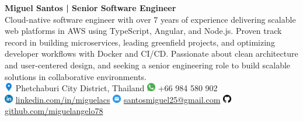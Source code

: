\documentclass[11pt,a4paper]{moderncv}
\title{}
\begin{document}
\vspace*{-2em}
\noindent
\begin{minipage}[t]{0.13\textwidth}
\end{minipage}%
\hspace{2em}%
\begin{minipage}[c]{0.80\textwidth}
  \raggedright
  \textbf{\LARGE Miguel Santos | Senior Software Engineer}\\[0.3em]
  Cloud-native software engineer with over 7 years of experience delivering scalable web platforms in AWS using TypeScript, Angular, and Node.js. Proven track record in building microservices, leading greenfield projects, and optimizing developer workflows with Docker and CI/CD. Passionate about clean architecture and user-centered design, and seeking a senior engineering role to build scalable solutions in collaborative environments.\\[0.8em]
  {\footnotesize
    \includegraphics[height=1em]{images/icon-location.png}
    Phetchaburi City District, Thailand 
    \hspace{0.8em}
    {\includegraphics[height=1em]{images/icon-whatsapp.png}}
    +66 984 580 902 \\[0.3em]

    {\includegraphics[height=1em]{images/icon-linkedin.png}}
    \href{https://linkedin.com/in/miguelacs}{linkedin.com/in/miguelacs}
    \hspace{0.8em}
    {\includegraphics[height=1em]{images/icon-email.png}}
    \href{mailto:santosmiguel25@gmail.com}{santosmiguel25@gmail.com}
    \hspace{0.8em}
    {\includegraphics[height=1em]{images/icon-github.png}}
    \href{https://github.com/miguelangelo78}{github.com/miguelangelo78}
  }
\end{minipage}
\end{document}
